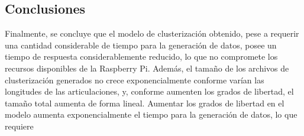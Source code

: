 \subsection{Conclusiones}

Finalmente, se concluye que el modelo de clusterización obtenido, pese a requerir una cantidad considerable de tiempo para la generación de datos, posee un tiempo de respuesta considerablemente reducido, lo que no compromete los recursos disponibles de la Raspberry Pi. Además, el tamaño de los archivos de clusterización generados no crece exponencialmente conforme varían las longitudes de las articulaciones, y, conforme aumenten los grados de libertad, el tamaño total aumenta de forma lineal. Aumentar los grados de libertad en el modelo aumenta exponencialmente el tiempo para la generación de datos, lo que requiere 